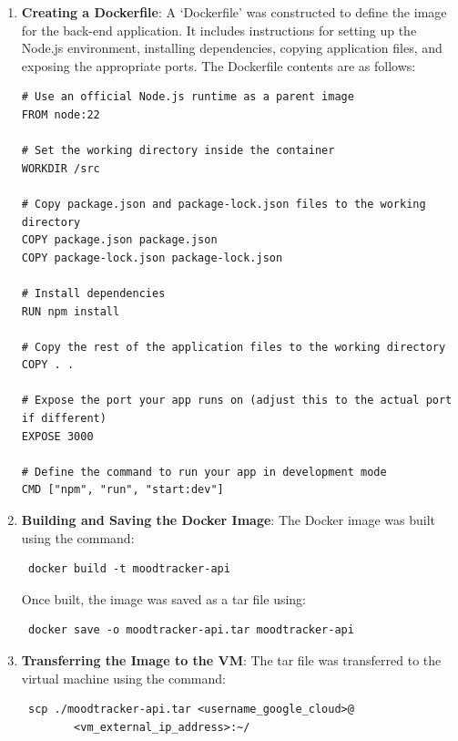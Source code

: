 \begin{enumerate}
    \item \textbf{Creating a Dockerfile}: A `Dockerfile' was constructed to define the image for the back-end application. It includes instructions for setting up the Node.js environment, installing dependencies, copying application files, and exposing the appropriate ports. The Dockerfile contents are as follows:
    
    \vspace{5mm}
    
\begin{lstlisting}[caption={Back-end Dockerfile}]
# Use an official Node.js runtime as a parent image
FROM node:22

# Set the working directory inside the container
WORKDIR /src

# Copy package.json and package-lock.json files to the working directory
COPY package.json package.json
COPY package-lock.json package-lock.json

# Install dependencies
RUN npm install

# Copy the rest of the application files to the working directory
COPY . .

# Expose the port your app runs on (adjust this to the actual port if different)
EXPOSE 3000

# Define the command to run your app in development mode
CMD ["npm", "run", "start:dev"]
\end{lstlisting}        

    \vspace{5mm}
        
    \item \textbf{Building and Saving the Docker Image}: The Docker image was built using the command: \begin{verbatim} docker build -t moodtracker-api \end{verbatim}
    Once built, the image was saved as a tar file using: \begin{verbatim} docker save -o moodtracker-api.tar moodtracker-api \end{verbatim}
    
    \item \textbf{Transferring the Image to the VM}: The tar file was transferred to the virtual machine using the command: \begin{verbatim} scp ./moodtracker-api.tar <username_google_cloud>@
        <vm_external_ip_address>:~/ \end{verbatim}
    

\end{enumerate}
